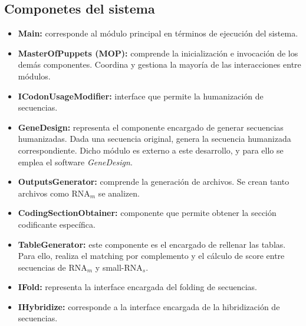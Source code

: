 \documentclass[12pt,a4paper,spanish]{article}
\begin{document}
\subsection{Componetes del sistema}
   \begin{itemize}
      \item \textbf{Main:} corresponde al módulo principal en términos de ejecución del sistema.

      \item \textbf{MasterOfPuppets (MOP):}  comprende la inicialización e invocación de los demás
      componentes. Coordina y gestiona la mayoría de las interacciones entre módulos.
    
      \item \textbf{ICodonUsageModifier:} interface que permite la humanización de secuencias.  

      \item \textbf{GeneDesign:} representa el componente encargado de generar secuencias humanizadas. Dada
      una secuencia original, genera la secuencia humanizada correspondiente. Dicho módulo es externo a este
      desarrollo, y para ello se emplea el software \emph{GeneDesign}.

      \item \textbf{OutputsGenerator:} comprende la generación de archivos. Se crean tanto archivos como 
      RNA$_m$ se analizen.

      \item \textbf{CodingSectionObtainer:} componente que permite obtener la sección codificante específica. 
		
      \item \textbf{TableGenerator:} este componente es el encargado de rellenar las tablas. Para ello,
      realiza el matching por complemento y el cálculo de score entre secuencias de RNA$_m$ y small-RNA$_s$. 

      \item \textbf{IFold:} representa la interface encargada del folding de secuencias.

      \item \textbf{IHybridize:} corresponde a la interface encargada de la hibridización de secuencias.
   \end{itemize}
\end{document}

